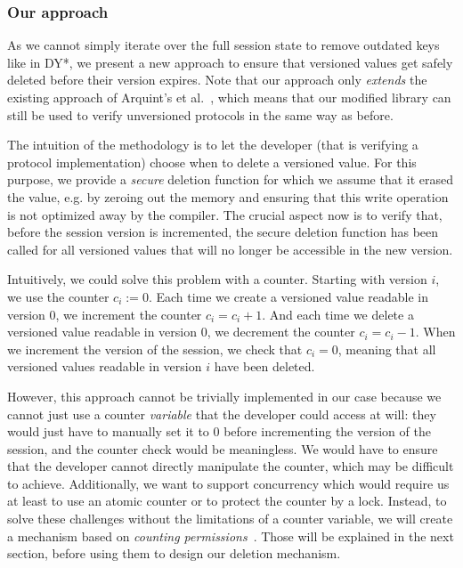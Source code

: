 \subsubsection{Our approach}
\label{sec:our-approach}

As we cannot simply iterate over the full session state to remove outdated keys like in DY*, we present a new approach to ensure that versioned values get safely deleted before their version expires.
Note that our approach only \emph{extends} the existing approach of Arquint's et al.~\cite{ArquintSchwerhoffMehtaMueller23}, which means that our modified library can still be used to verify unversioned protocols in the same way as before.

The intuition of the methodology is to let the developer (that is verifying a protocol implementation) choose when to delete a versioned value.
For this purpose, we provide a \emph{secure} deletion function for which we assume that it erased the value, e.g. by zeroing out the memory and ensuring that this write operation is not optimized away by the compiler.
The crucial aspect now is to verify that, before the session version is incremented, the secure deletion function has been called for all versioned values that will no longer be accessible in the new version.

Intuitively, we could solve this problem with a counter. Starting with version $i$, we use the counter $c_i:=0$.
Each time we create a versioned value readable in version $0$, we increment the counter $c_i = c_i + 1$.
And each time we delete a versioned value readable in version $0$, we decrement the counter $c_i = c_i - 1$.
When we increment the version of the session, we check that $c_i = 0$, meaning that all versioned values readable in version $i$ have been deleted.

However, this approach cannot be trivially implemented in our case because we cannot just use a counter \emph{variable} that the developer could access at will: they would just have to manually set it to $0$ before incrementing the version of the session, and the counter check would be meaningless.
We would have to ensure that the developer cannot directly manipulate the counter, which may be difficult to achieve.
Additionally, we want to support concurrency which would require us at least to use an atomic counter or to protect the counter by a lock.
Instead, to solve these challenges without the limitations of a counter variable, we will create a mechanism based on \emph{counting permissions}~\cite{roshardt2021extending}. Those will be explained in the next section, before using them to design our deletion mechanism.

